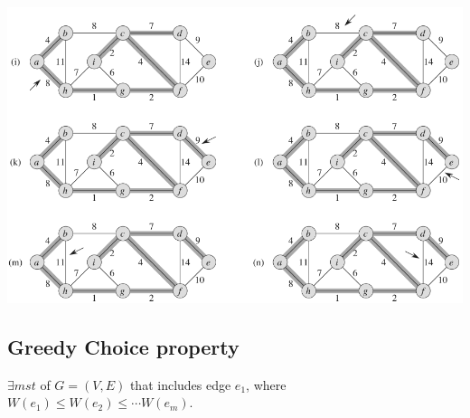 \documentclass[a4paper]{article}
\begin{document}
\includegraphics[width=\textwidth]{Kruskal2}
\subsection*{Greedy Choice property}
$\exists{mst}$ of $G=(V,E)$ that includes edge $e_1$, where $W(e_1)\leq W(e_2)\leq \cdots W(e_m)$.
\end{document}

